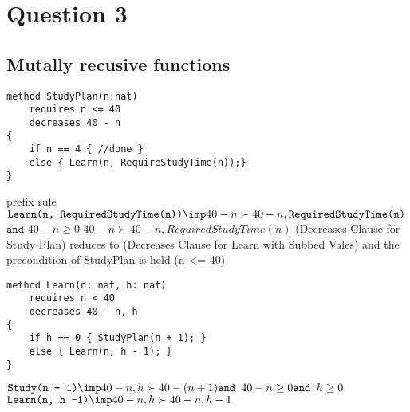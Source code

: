 \section{Question 3}

\subsection{Mutally recusive functions}

\begin{verbatim}
method StudyPlan(n:nat)
    requires n <= 40
    decreases 40 - n
{
    if n == 4 { //done }
    else { Learn(n, RequireStudyTime(n));}
}
\end{verbatim}
prefix rule
$\texttt{Learn(n, RequiredStudyTime(n))} \imp 40 - n \succ 40-n, \texttt{RequiredStudyTime(n)}$
$\texttt{and }  40-n \geq 0$
$40 - n \succ 40 - n, RequiredStudyTime(n)$
\newline
\newline
(Decreases Clause for Study Plan) reduces to (Decreases Clause for Learn with Subbed Vales) and the precondition of StudyPlan is held (n <= 40)

\begin{verbatim}
method Learn(n: nat, h: nat) 
    requires n < 40
    decreases 40 - n, h
{
    if h == 0 { StudyPlan(n + 1); }
    else { Learn(n, h - 1); }
}
\end{verbatim}

$\texttt{Study(n + 1)} \imp 40 - n, h \succ 40-(n+1) \texttt{and } 40 - n \geq 0 \texttt{and } h \geq 0$
$\texttt{Learn(n, h -1)} \imp 40 -n, h \succ 40 -n, h -1$